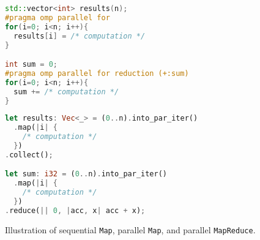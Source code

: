     \begin{figure}[!b!]
        \vspace{-0.8cm}
         \centering
         \caption{Illustration of sequential \texttt{Map}, parallel \texttt{Map}, and parallel \texttt{MapReduce}.}
         \vspace{0.8cm}

    \lstset{aboveskip=0pt, belowskip=7pt}
    \begin{lstlisting}[language=C++, style=boxed,caption={\texttt{Map} and \texttt{MapReduce} with OpenMP in C++.}, label={lst:map_c}]
std::vector<int> results(n);
#pragma omp parallel for
for(i=0; i<n; i++){
  results[i] = /* computation */
}

int sum = 0;
#pragma omp parallel for reduction (+:sum)
for(i=0; i<n; i++){
  sum += /* computation */
}
\end{lstlisting}
\vspace{0.4cm}
    \lstset{aboveskip=0pt, belowskip=0pt}
    \begin{lstlisting}[language=Rust, style=boxed,caption={\texttt{Map} and \texttt{MapReduce} with Rayon in Rust.}, label={lst:map_r}]
let results: Vec<_> = (0..n).into_par_iter()
  .map(|i| {
    /* computation */
  })
.collect();

let sum: i32 = (0..n).into_par_iter()
  .map(|i| {
    /* computation */
  })
.reduce(|| 0, |acc, x| acc + x);
\end{lstlisting}
    \end{figure}


